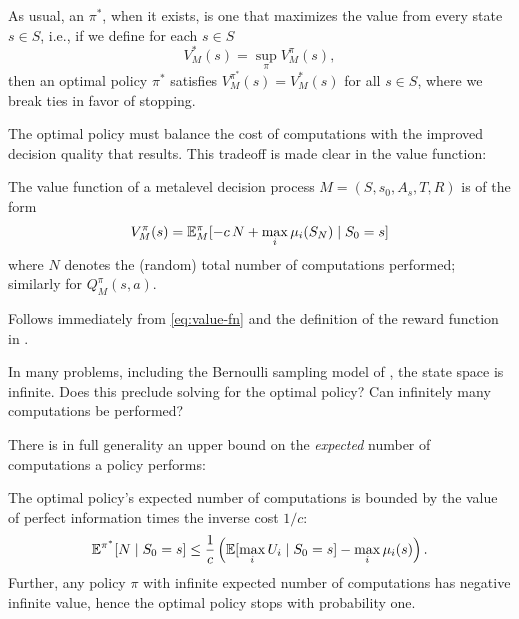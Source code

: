 As usual, an  $\pi^*$, when it exists, is one that maximizes 
the value from every state $s\in S$, i.e., if we define for each $s\in S$
\[
	V^*_M(s)   = \sup_\pi V^\pi_M(s),
\]
then an optimal policy $\pi^*$ satisfies $V^{\pi^*}_M(s) = V^*_M(s)$
for all $s\in S$, where we break ties in favor of stopping.

The optimal policy must balance the cost of computations with the improved decision
quality that results.  This tradeoff is made clear in the value function:

\begin{thm}\label{thm:value-of-computation}
	The value function of a metalevel decision process $M=(S,s_0,A_s,T,R)$ is of the form
	\[
		V^\pi_M(s) = \mathbb{E}^\pi_M[ -c\,N + \max_i \mu_i(S_N) \mid S_0=s]
	\]
	where $N$ denotes the (random) total number of computations performed;
	similarly for $Q^\pi_M(s,a)$.
\end{thm}

\begin{hiddenproof}
	Follows immediately from \eqref{eq:value-fn} and the definition of the
	reward function in .
\end{hiddenproof}

In many problems, including the Bernoulli sampling model of ,
the state space is infinite. Does this preclude solving for the optimal policy?  Can 
infinitely many computations be performed? 


There is in full generality an upper bound on the \emph{expected} number of computations
a policy performs:

\begin{thm}\label{thm:bounded-expected-computations}
	The optimal policy's expected number of computations is bounded by the 
	value of perfect information \citep{Howard:1966} times the inverse cost $1/c$:
	\[
		\mathbb{E}^{\pi^*}[N\mid S_0=s] \le \frac{1}{c} \left(\mathbb{E}[\max_i U_i\mid S_0=s] - \max_i \mu_i(s)\right).
	\]
	Further, any policy $\pi$ with infinite expected number of computations 
	has negative infinite value, hence the optimal
	policy stops with probability one.
\end{thm}

